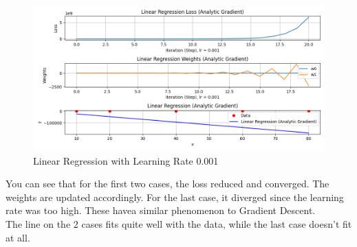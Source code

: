 \documentclass{article}
\begin{document}
\begin{figure}[ht]
  \centering
  \includegraphics[width=1\textwidth]{images/lab2/linear_regression_(0.001).png}
  \caption{Linear Regression with Learning Rate 0.001}
  \label{fig:lr_0.001}
\end{figure}

\newpage
\noindent You can see that for the first two cases, the loss reduced and converged. The weights are updated accordingly. For the last case, it diverged since the learning rate was too high. These havea  similar phenomenon to Gradient Descent.\\
\noindent The line on the 2 cases fits quite well with the data, while the last case doesn't fit at all.
\end{document}
